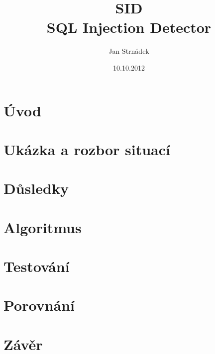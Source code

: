 \documentclass[12pt, a4paper]{report}
\begin{document}
\author{Jan Strnádek}
\date{10.10.2012}
\title{SID\\\small{SQL Injection Detector}}
\begin{titlepage}
\maketitle
\end{titlepage}
\tableofcontents
\chapter{Úvod}
\chapter{Ukázka a rozbor situací}
\chapter{Důsledky}
\chapter{Algoritmus}
\chapter{Testování}
\chapter{Porovnání}
\chapter{Závěr}
\end{document}
